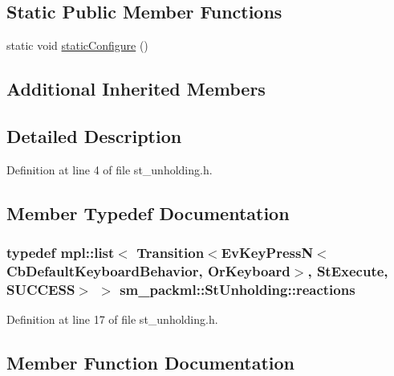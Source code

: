 \subsection*{Static Public Member Functions}
\begin{DoxyCompactItemize}
\item 
static void \hyperlink{structsm__packml_1_1StUnholding_aa4784965cafac37bf397fce056f7b02b}{static\+Configure} ()
\end{DoxyCompactItemize}
\subsection*{Additional Inherited Members}


\subsection{Detailed Description}


Definition at line 4 of file st\+\_\+unholding.\+h.



\subsection{Member Typedef Documentation}
\subsubsection[{\texorpdfstring{reactions}{reactions}}]{\setlength{\rightskip}{0pt plus 5cm}typedef mpl\+::list$<$ Transition$<$Ev\+Key\+PressN$<$Cb\+Default\+Keyboard\+Behavior, {\bf Or\+Keyboard}$>$, {\bf St\+Execute}, {\bf S\+U\+C\+C\+E\+SS}$>$ $>$ {\bf sm\+\_\+packml\+::\+St\+Unholding\+::reactions}}\hypertarget{structsm__packml_1_1StUnholding_a8fe30f4aae70738cdbac445596f86c8c}{}\label{structsm__packml_1_1StUnholding_a8fe30f4aae70738cdbac445596f86c8c}


Definition at line 17 of file st\+\_\+unholding.\+h.



\subsection{Member Function Documentation}
